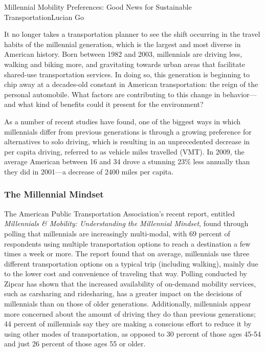 \documentclass[10pt]{papertex}
\begin{document}
\makeatletter
\renewcommand{\papertex@headDateTime}{
    \raisebox{-5pt}
    {\fontsize{5mm}{6mm}\usefont{T1}{bch}{b}{n}{April 2014}}
    }
\makeatother

\begin{news}{2}{Millennial Mobility Preferences: Good News for Sustainable Transportation}{Lucian Go}{}{}

It no longer takes a transportation planner to see the shift occurring in the 
travel habits of the millennial generation, which is the largest and most 
diverse in American history. Born between 1982 and 2003, millennials are 
driving less, walking and biking more, and gravitating towards urban areas 
that facilitate shared-use transportation services. In doing so, this 
generation is beginning to chip away at a decades-old constant in American 
transportation: the reign of the personal automobile. What factors are 
contributing to this change in behavior—and what kind of benefits could it 
present for the environment?

As a number of recent studies have found, one of the biggest ways in which 
millennials differ from previous generations is through a growing preference 
for alternatives to solo driving, which is resulting in an unprecedented 
decrease in per capita driving, referred to as vehicle miles travelled (VMT). 
In 2009, the average American between 16 and 34 drove a stunning 23\% less 
annually than they did in 2001—a decrease of 2400 miles per capita.

\subsubsection*{The Millennial Mindset}

The American Public Transportation Association’s recent report, entitled 
\emph{Millennials \& Mobility: Understanding the Millennial Mindset}, found 
through polling that millennials are increasingly multi-modal, with 69 percent 
of respondents using multiple transportation options to reach a destination a 
few times a week or more. The report found that on average, millennials use 
three different transportation options on a typical trip (including walking), 
mainly due to the lower cost and convenience of traveling that way. Polling 
conducted by Zipcar has shown that the increased availability of on-demand 
mobility services, such as carsharing and ridesharing, has a greater impact 
on the decisions of millennials than on those of older generations. 
Additionally, millennials appear more concerned about the amount of driving 
they do than previous generations; 44 percent of millennials say they are 
making a conscious effort to reduce it by using other modes of transportation, 
as opposed to 30 percent of those ages 45-54 and just 26 percent of those 
ages 55 or older.


\end{news}
\end{document}

